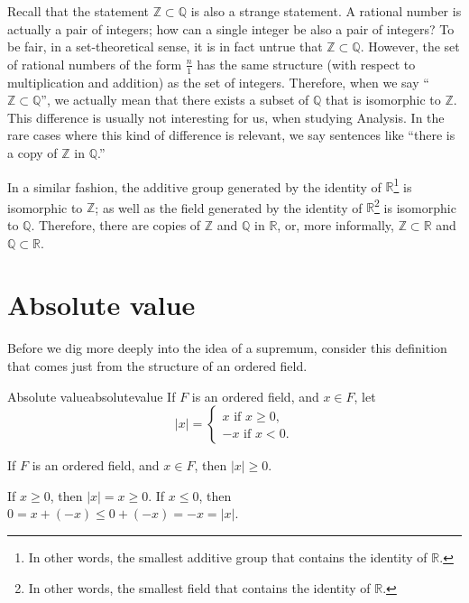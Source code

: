 Recall that the statement \(\mathbb{Z} \subset \mathbb{Q}\) is also a strange statement. A rational number is actually a pair of integers; how can a single integer be also a pair of integers? To be fair, in a set-theoretical sense, it is in fact untrue that \(\mathbb{Z} \subset \mathbb{Q}\). However, the set of rational numbers of the form \(\frac{n}{1}\) has the same structure (with respect to multiplication and addition) as the set of integers. Therefore, when we say ``\(\mathbb{Z} \subset \mathbb{Q}\)'', we actually mean that there exists a subset of \(\mathbb{Q}\) that is isomorphic to \(\mathbb{Z}\). This difference is usually not interesting for us, when studying Analysis. In the rare cases where this kind of difference is relevant, we say sentences like ``there is a copy of \(\mathbb{Z}\) in \(\mathbb{Q}\).''

In a similar fashion, the additive group generated by the identity of \(\mathbb{R}\)\footnote{In other words, the smallest additive group that contains the identity of \(\mathbb{R}\).} is isomorphic to \(\mathbb{Z}\); as well as the field generated by the identity of \(\mathbb{R}\)\footnote{In other words, the smallest field that contains the identity of \(\mathbb{R}\).} is isomorphic to \(\mathbb{Q}\). Therefore, there are copies of \(\mathbb{Z}\) and \(\mathbb{Q}\) in \(\mathbb{R}\), or, more informally, \(\mathbb{Z} \subset \mathbb{R}\) and \(\mathbb{Q} \subset \mathbb{R}\).

\section{Absolute value}

Before we dig more deeply into the idea of a supremum, consider this definition that comes just from the structure of an ordered field.

\begin{defn}{Absolute value}{absolutevalue}
	If \(F\) is an ordered field, and \(x \in F\), let \[
		|x| =
		\begin{cases}
			x \text{\ if\ } x \geq 0\text{,} \\
			-x \text{\ if\ } x < 0\text{.}
		\end{cases}
	\]
\end{defn}

\begin{thm}{}{}
	If \(F\) is an ordered field, and \(x \in F\), then \(|x| \geq 0\).
\end{thm}

\begin{dem}{}{}
	If \(x \geq 0\), then \(|x| = x \geq 0\).
	If \(x \leq 0\), then \(0 = x + (-x) \leq 0 + (-x) = -x = |x|\).
\end{dem}

